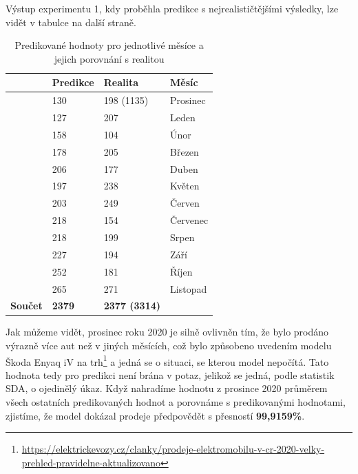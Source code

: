 \documentclass[14pt]{extarticle}
\begin{document}
    Výstup experimentu 1, kdy proběhla predikce s nejrealističtějšími výsledky, lze vidět v tabulce na další straně.
    
    \begin{table}[]
    \centering
    \captionsetup{justification=centering}

        \begin{tabular}{|l|l|l|l|}
        \hline
                        & \textbf{Predikce} & \textbf{Realita}     & \textbf{Měsíc} \\ \hline
                        & 130               & 198 (1135)           & Prosinec       \\ \hline
                        & 127               & 207                  & Leden          \\ \hline
                        & 158               & 104                  & Únor           \\ \hline
                        & 178               & 205                  & Březen         \\ \hline
                        & 206               & 177                  & Duben          \\ \hline
                        & 197               & 238                  & Květen         \\ \hline
                        & 203               & 249                  & Červen         \\ \hline
                        & 218               & 154                  & Červenec       \\ \hline
                        & 218               & 199                  & Srpen          \\ \hline
                        & 227               & 194                  & Září           \\ \hline
                        & 252               & 181                  & Říjen          \\ \hline
                        & 265               & 271                  & Listopad       \\ \hline
        \textbf{Součet} & \textbf{2379}     & \textbf{2377 (3314)} &                \\ \hline
        \end{tabular}
        \caption{Predikované hodnoty pro jednotlivé měsíce a jejich porovnání s realitou}
    \end{table}
    
    Jak můžeme vidět, prosinec roku 2020 je silně ovlivněn tím, že bylo prodáno výrazně více aut než v jiných měsících, což bylo způsobeno uvedením modelu Škoda Enyaq iV na trh\footnote{\url{https://elektrickevozy.cz/clanky/prodeje-elektromobilu-v-cr-2020-velky-prehled-pravidelne-aktualizovano}} a jedná se o situaci, se kterou model nepočítá. Tato hodnota tedy pro predikci není brána v potaz, jelikož se jedná, podle statistik SDA, o ojedinělý úkaz. Když nahradíme hodnotu z prosince 2020 průměrem všech ostatních predikovaných hodnot a porovnáme s predikovanými hodnotami, zjistíme, že model dokázal prodeje předpovědět s přesností \textbf{99,9159\%}.
    
\end{document}
